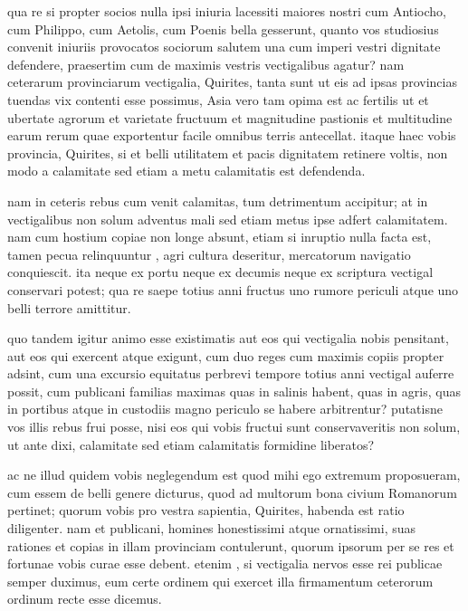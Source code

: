  qua re si propter socios nulla ipsi iniuria lacessiti maiores nostri cum Antiocho, cum Philippo, cum Aetolis, cum Poenis bella gesserunt, quanto vos studiosius convenit iniuriis provocatos sociorum salutem una cum imperi vestri dignitate defendere, praesertim cum de maximis vestris vectigalibus agatur? nam ceterarum provinciarum vectigalia, Quirites, tanta sunt ut eis ad ipsas provincias tuendas vix contenti esse possimus, Asia vero tam opima est ac fertilis ut et ubertate agrorum et varietate fructuum et magnitudine pastionis et multitudine earum rerum quae exportentur facile omnibus terris antecellat. itaque haec vobis provincia, Quirites, si et belli utilitatem et pacis dignitatem retinere voltis, non modo a calamitate sed etiam a metu calamitatis est defendenda.

 nam in ceteris rebus cum venit calamitas, tum detrimentum accipitur; at in vectigalibus non solum adventus mali sed etiam metus ipse adfert calamitatem. nam cum hostium copiae non longe absunt, etiam si inruptio nulla facta est, tamen pecua relinquuntur , agri cultura deseritur, mercatorum navigatio conquiescit. ita neque ex portu neque ex decumis neque ex scriptura vectigal conservari potest; qua re saepe totius anni fructus uno rumore periculi atque uno belli terrore amittitur.

 quo tandem igitur animo esse existimatis aut eos qui vectigalia nobis pensitant, aut eos qui exercent atque exigunt, cum duo reges cum maximis copiis propter adsint, cum una excursio equitatus perbrevi tempore totius anni vectigal auferre possit, cum publicani familias maximas quas in salinis habent, quas in agris, quas in portibus atque in custodiis magno periculo se habere arbitrentur? putatisne vos illis rebus frui posse, nisi eos qui vobis fructui sunt conservaveritis non solum, ut ante dixi, calamitate sed etiam calamitatis formidine liberatos?

 ac ne illud quidem vobis neglegendum est quod mihi ego extremum proposueram, cum essem de belli genere dicturus, quod ad multorum bona civium Romanorum pertinet; quorum vobis pro vestra sapientia, Quirites, habenda est ratio diligenter. nam et publicani, homines honestissimi atque ornatissimi, suas rationes et copias in illam provinciam contulerunt, quorum ipsorum per se res et fortunae vobis curae esse debent. etenim , si vectigalia nervos esse rei publicae semper duximus, eum certe ordinem qui exercet illa firmamentum ceterorum ordinum recte esse dicemus.

